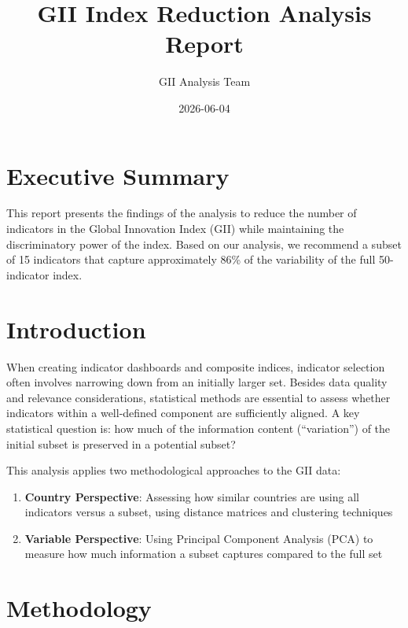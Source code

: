 \documentclass[
  letterpaper,
  DIV=11,
  numbers=noendperiod]{scrartcl}
\title{GII Index Reduction Analysis Report}
\author{GII Analysis Team}
\date{2026-06-04}
\providecommand{\tightlist}{%
  \setlength{\itemsep}{0pt}\setlength{\parskip}{0pt}}
\renewcommand*\contentsname{Table of contents}
\newcommand\contentsname{Table of contents}
\begin{document}
\maketitle

\renewcommand*\contentsname{Table of contents}
{
\setcounter{tocdepth}{3}
\tableofcontents
}

\section{Executive Summary}\label{executive-summary}

This report presents the findings of the analysis to reduce the number
of indicators in the Global Innovation Index (GII) while maintaining the
discriminatory power of the index. Based on our analysis, we recommend a
subset of 15 indicators that capture approximately 86\% of the
variability of the full 50-indicator index.

\section{Introduction}\label{introduction}

When creating indicator dashboards and composite indices, indicator
selection often involves narrowing down from an initially larger set.
Besides data quality and relevance considerations, statistical methods
are essential to assess whether indicators within a well-defined
component are sufficiently aligned. A key statistical question is: how
much of the information content (``variation'') of the initial subset is
preserved in a potential subset?

This analysis applies two methodological approaches to the GII data:

\begin{enumerate}
\def\labelenumi{\arabic{enumi}.}
\tightlist
\item
  \textbf{Country Perspective}: Assessing how similar countries are
  using all indicators versus a subset, using distance matrices and
  clustering techniques
\item
  \textbf{Variable Perspective}: Using Principal Component Analysis
  (PCA) to measure how much information a subset captures compared to
  the full set
\end{enumerate}

\section{Methodology}\label{methodology}
\end{document}

